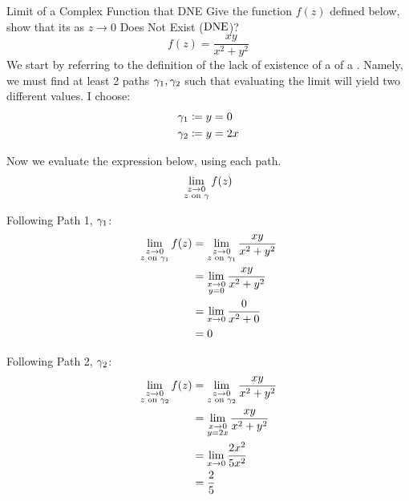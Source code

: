 \begin{example}[Lecture 5]{Limit of a Complex Function that DNE}
  Give the function $f(z)$ defined below, show that its  as $z \to 0$ Does Not Exist ($\mathrm{DNE}$)?
  \begin{equation*}
    f(z) = \frac{xy}{x^{2} + y^{2}}
  \end{equation*}
  \tcblower{}
  We start by referring to the definition of the lack of existence of a  of a .
  Namely, we must find at least 2 paths $\gamma_{1}, \gamma_{2}$ such that evaluating the limit will yield two different values.
  I choose:
  \begin{align*}
    \gamma_{1} &\coloneqq y = 0 \\
    \gamma_{2} &\coloneqq y = 2x
  \end{align*}

  Now we evaluate the expression below, using each path.
  \begin{equation*}
    \lim\limits_{\substack{z \to 0 \\ z \text{ on } \gamma}} f(z)
  \end{equation*}

  Following Path 1, $\gamma_{1}$:
  \begin{align*}
    \lim\limits_{\substack{z \to 0 \\ z \text{ on } \gamma_{1}}} f(z) &= \lim\limits_{\substack{z \to 0 \\ z \text{ on } \gamma_{1}}} \frac{xy}{x^{2}+y^{2}} \\
                                                                     &= \lim\limits_{\substack{x \to 0 \\ y = 0}} \frac{xy}{x^{2}+y^{2}} \\
                                                                     &= \lim\limits_{x \to 0} \frac{0}{x^{2}+0} \\
                                                                     &= 0
  \end{align*}

  Following Path 2, $\gamma_{2}$:
  \begin{align*}
    \lim\limits_{\substack{z \to 0 \\ z \text{ on } \gamma_{2}}} f(z) &= \lim\limits_{\substack{z \to 0 \\ z \text{ on } \gamma_{2}}} \frac{xy}{x^{2}+y^{2}} \\
                                                                     &= \lim\limits_{\substack{x \to 0 \\ y = 2x}} \frac{xy}{x^{2}+y^{2}} \\
                                                                     &= \lim\limits_{x \to 0} \frac{2x^{2}}{5x^{2}} \\
                                                                     &= \frac{2}{5}
  \end{align*}


\end{example}
